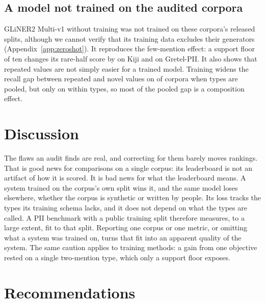 \documentclass[11pt]{article}
\begin{document}
\subsection{A model not trained on the audited corpora}
\label{sec:zeroshot}

GLiNER2 Multi-v1 without training was not trained on these corpora's
released splits, although we cannot verify that its training data
excludes their generators (Appendix~\ref{app:zeroshot}). It reproduces
the few-mention effect: a support floor of ten changes its rare-half
score by  on Kiji and  on
Gretel-PII. It also shows that repeated values are not simply easier
for a trained model. Training widens the recall gap between repeated
and novel values on  of  corpora when
types are pooled, but only on  within types, so most of
the pooled gap is a composition effect.

\section{Discussion}
\label{sec:discussion}

The flaws an audit finds are real, and correcting for them barely moves
rankings. That is good news for comparisons on a single corpus: its
leaderboard is not an artifact of how it is scored. It is bad news for
what the leaderboard means. A system trained on the corpus's own split
wins it, and the same model loses elsewhere, whether the corpus is
synthetic or written by people. Its loss tracks the types its training
schema lacks, and it does not depend on what the types are called. A PII
benchmark with a
public training split therefore measures, to a large extent, fit to
that split. Reporting one corpus or one metric, or omitting what a
system was trained on, turns that fit into an apparent quality of the
system. The same caution applies to training methods: a gain from one
objective rested on a single two-mention type, which only a support
floor exposes.

\section{Recommendations}
\label{sec:recommendations}
\end{document}
